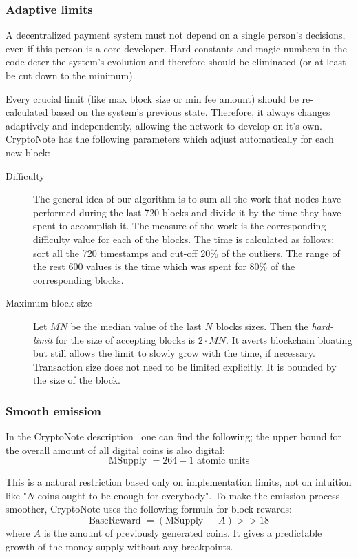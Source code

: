 \subsubsection{Adaptive limits}
A decentralized payment system must not depend on a single person's decisions, even if this person is a core developer. Hard constants and magic numbers in the code deter the system's evolution and therefore should be eliminated (or at least be cut down to the minimum).

Every crucial limit (like max block size or min fee amount) should be re-calculated based on the system's previous state. Therefore, it always changes adaptively and independently, allowing the network to develop on it's own. CryptoNote has the following parameters which adjust automatically for each new block:
\clearpage
\pagebreak

\begin{description}
  \item [Difficulty] The general idea of our algorithm is to sum all the work that nodes have performed during the last 720 blocks and divide it by the time they have spent to accomplish it. The measure of the work is the corresponding difficulty value for each of the blocks. The time is calculated as follows: sort all the 720 timestamps and cut-off 20\% of the outliers. The range of the rest 600 values is the time which was spent for 80\% of the corresponding blocks.
  \item [Maximum block size] Let $MN$ be the median value of the last $N$ blocks sizes. Then the \emph{hard-limit} for the size of accepting blocks is $2 \cdot MN$. It averts blockchain bloating but still allows the limit to slowly grow with the time, if necessary. Transaction size does not need to be limited explicitly. It is bounded by the size of the block.
\end{description}

\subsubsection{Smooth emission}
In the CryptoNote description~\cite{cryptonote} one can find the following; the upper bound for the overall amount of all digital coins is also digital:
\begin{equation}
  \mbox{MSupply } = 264 − 1 \mbox{ atomic units}
\end{equation}

This is a natural restriction based only on implementation limits, not on intuition like "$N$ coins ought to be enough for everybody". To make the emission process smoother, CryptoNote uses the following formula for block rewards:
\begin{equation}
  \mbox{BaseReward } = (\mbox{MSupply } - A) >> 18
\end{equation}
where $A$ is the amount of previously generated coins. It gives a predictable growth of the money supply without any breakpoints.

